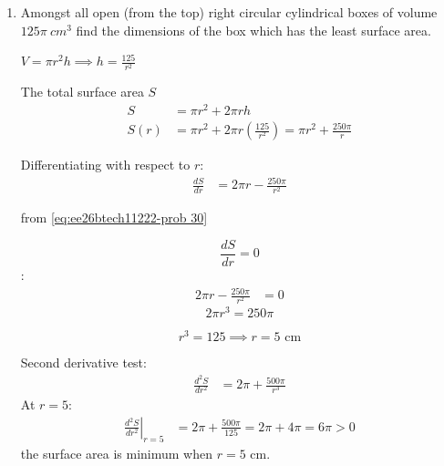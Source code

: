 \begin{enumerate}[label=\thesubsection.\arabic*, ref=\thesubsection.\theenumi]
\begin{center}
    or 
\end{center}
\textbf{question :}

If $y=e^{a~cos^{-1}x},-1<x<1$, then show that $(1-x^{2})\frac{d^{2}y}{dx^{2}}-x\frac{dy}{dx}-a^{2}y=0$

\solution

$\frac{dy}{dx}=-e^{a cos^{-1}x}a(\frac{1}{\sqrt{1-x^2}}) \implies$ $\frac{dy}{dx}= \frac{-ay}{\sqrt{1-x^2}} \implies \sqrt{1-x^2}\frac{dy}{dx}= -ay$


$$(1-x^2)(\frac{dy}{dx})^2=a^2y^2$$ 
$$2\frac{d^2y}{dx^2}\frac{dy}{dx}(1-x^2)-2x\left(\frac{dy}{dx}\right)^2=a^2y^2$$ \begin{align}
	2\frac{d^2y}{dx^2}(\frac{-ay}{\sqrt{1-x^2}})(1-x^2)-2x\frac{a^2y^2}{1-x^2}= 2a^2y(\frac{-ay}{\sqrt{1-x^2}}) \end{align}
$$ (1-x^2)\frac{d^2y}{dx^2}-x\left(\frac{-ay}{\sqrt{1-x^2}}\right)=a^2y$$
\begin{align}
	(1-x^{2})\frac{d^{2}y}{dx^{2}}-x\frac{dy}{dx}-a^{2}y=0
\end{align}

\item 

Amongst all open (from the top) right circular cylindrical boxes of volume $125\pi~cm^{3}$ find the dimensions of the box which has the least surface area.  

\solution

$V=\pi r^2h \implies h= \frac{125}{r^2}$

The total surface area $S$
\begin{align}
S &= \pi r^2 + 2\pi r h \\
S(r) &= \pi r^2 + 2\pi r \left(\frac{125}{r^2}\right) = \pi r^2 + \frac{250\pi}{r}
\end{align}

Differentiating with respect to $r$:
\begin{align}
\frac{dS}{dr} &= 2\pi r - \frac{250\pi}{r^2}
\end{align}

from \eqref{eq:ee26btech11222-prob 30}

$$\frac{dS}{dr} = 0$$:
\begin{align}
2\pi r - \frac{250\pi}{r^2} &= 0 
\end{align}
$$2\pi r^3 = 250\pi$$ 

$$r^3 = 125 \implies r = 5\text{ cm}$$

Second derivative test:
\begin{align}
\frac{d^2S}{dr^2} &= 2\pi + \frac{500\pi}{r^3}
\end{align}
At $r = 5$:
\begin{align}
\left.\frac{d^2S}{dr^2}\right|_{r=5} &= 2\pi + \frac{500\pi}{125} = 2\pi + 4\pi = 6\pi > 0
\end{align}
the surface area is minimum when $r = 5\text{ cm}$.


\end{enumerate}

